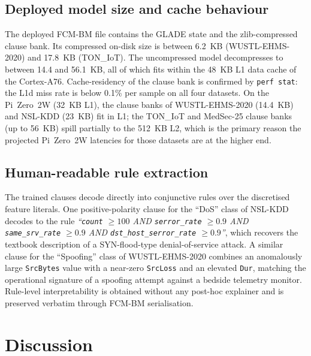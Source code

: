 \documentclass[journal,10pt]{IEEEtran}
\begin{document}
\subsection{Deployed model size and cache behaviour}
\label{sec:res-memory}

The deployed FCM-BM file contains the GLADE state and the
zlib-compressed clause bank. Its compressed on-disk size is between
6.2~KB (WUSTL-EHMS-2020) and 17.8~KB (TON\_IoT). The uncompressed
model decompresses to between 14.4 and 56.1~KB, all of which fits
within the 48~KB L1 data cache of the Cortex-A76. Cache-residency
of the clause bank is confirmed by \texttt{perf stat}: the L1d miss
rate is below 0.1\% per sample on all four datasets. On the Pi~Zero~2W
(32~KB L1), the clause banks of WUSTL-EHMS-2020 (14.4~KB) and
NSL-KDD (23~KB) fit in L1; the TON\_IoT and MedSec-25 clause banks
(up to 56~KB) spill partially to the 512~KB L2, which is the primary
reason the projected Pi~Zero~2W latencies for those datasets are at
the higher end.

\subsection{Human-readable rule extraction}
\label{sec:res-rules}

The trained clauses decode directly into conjunctive rules over the
discretised feature literals. One positive-polarity clause for the
``DoS'' class of NSL-KDD decodes to the rule
\emph{``\texttt{count} $\ge 100$ AND \texttt{serror\_rate} $\ge 0.9$
AND \texttt{same\_srv\_rate} $\ge 0.9$ AND
\texttt{dst\_host\_serror\_rate} $\ge 0.9$''},
which recovers the textbook description of a SYN-flood-type
denial-of-service attack. A similar clause for the ``Spoofing'' class
of WUSTL-EHMS-2020 combines an anomalously large \texttt{SrcBytes}
value with a near-zero \texttt{SrcLoss} and an elevated \texttt{Dur},
matching the operational signature of a spoofing attempt against a
bedside telemetry monitor. Rule-level interpretability is obtained
without any post-hoc explainer and is preserved verbatim through
FCM-BM serialisation.

\section{Discussion}
\label{sec:discussion}
\end{document}
